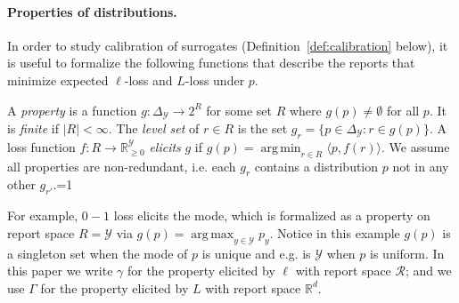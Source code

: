 \documentclass[anon]{colt2020} %
\newcommand{\Comments}{1}
\newcommand{\mytodo}[2]{\ifnum\Comments=1%
	\todo[linecolor=#1!80!black,backgroundcolor=#1,bordercolor=#1!80!black]{#2}\fi}
\newcommand{\jessiet}[1]{\mytodo{purple!20!white}{JF: #1}}
\newcommand{\reals}{\mathbb{R}}
\newcommand{\nonnegreals}{\reals_{\geq 0}}%
\newcommand{\simplex}{\Delta_\Y}
\newcommand{\R}{\mathcal{R}}
\newcommand{\Y}{\mathcal{Y}}
\newcommand{\inprod}[2]{\langle #1, #2 \rangle}%
\DeclareMathOperator*{\argmax}{arg\,max}
\DeclareMathOperator*{\argmin}{arg\,min}
\begin{document}
\paragraph{Properties of distributions.}
In order to study calibration of surrogates (Definition~\ref{def:calibration} below), it is useful to formalize the following functions that describe the reports that minimize expected $\ell$-loss and $L$-loss under $p$.
\begin{definition}
  A \emph{property} is a function $g: \simplex \to 2^{R}$ for some set $R$ where $g(p) \neq \emptyset$ for all $p$.
  It is \emph{finite} if $|R| < \infty$.
  The \emph{level set} of $r \in R$ is the set $g_r = \{p \in \simplex : r \in g(p)\}$.
  A loss function $f: R \to \nonnegreals^{\Y}$ \emph{elicits} $g$ if $g(p) = \argmin_{r \in R} \inprod{p}{f(r)}$.
  We assume all properties are non-redundant, i.e. each $g_r$ contains a distribution $p$ not in any other $g_{r'}$.\jessiet{$R$ or $\R$?}
\end{definition}
For example, $0-1$ loss elicits the mode, which is formalized as a property on report space $R = \Y$ via $g(p) = \argmax_{y \in \Y} p_y$.
Notice in this example $g(p)$ is a singleton set when the mode of $p$ is unique and e.g. is $\Y$ when $p$ is uniform.
In this paper we write $\gamma$ for the property elicited by $\ell$ with report space $\R$; and we use $\Gamma$ for the property elicited by $L$ with report space $\reals^d$.
\end{document}
